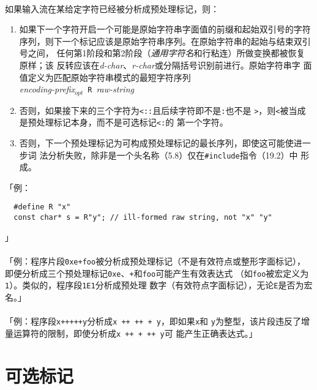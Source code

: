 \paragraph{}
如果输入流在某给定字符已经被分析成预处理标记，则：
\begin{enumerate}
  \item{如果下一个字符开启一个可能是原始字符串字面值的前缀和起始双引号的字符
    序列，则下一个标记应该是原始字符串序列。在原始字符串的起始与结束双引号之间，
    任何第1阶段和第2阶段（\textit{通用字符名}和行粘连）所做变换都被恢复原样；该
    反转应该在\textit{d-char}、\textit{r-char}或分隔括号识别前进行。原始字符串字
    面值定义为匹配原始字符串模式的最短字符序列 \\
    \mbox{\qquad \textit{encoding-prefix}$_{opt}$ \texttt{R}
    \textit{raw-string}}}
  \item{否则，如果接下来的三个字符为\texttt{<::}且后续字符即不是\texttt{:}也不是
    \texttt{>}，则\texttt{<}被当成是预处理标记本身，而不是可选标记\texttt{<:}的
    第一个字符。}
  \item{否则，下一个预处理标记为可构成预处理标记的最长序列，即使这可能使进一步词
    法分析失败，除非是一个头名称（5.8）仅在\texttt{\#include}指令（19.2）中
    形成。}
\end{enumerate}
「例：
\begin{lstlisting}
  #define R "x"
  const char* s = R"y"; // ill-formed raw string, not "x" "y"
\end{lstlisting}」

\paragraph{}
「例：程序片段\texttt{0xe+foo}被分析成预处理标记（不是有效符点或整形字面标记），
即便分析成三个预处理标记\texttt{0xe}、\texttt{+}和\texttt{foo}可能产生有效表达式
（如\texttt{foo}被宏定义为\texttt{1}）。类似的，程序段\texttt{1E1}分析成预处理
数字（有效符点字面标记），无论\texttt{E}是否为宏名。」

\paragraph{}
「例：程序段\texttt{x+++++y}分析成\texttt{x ++ ++ + y}，即如果\texttt{x}和
\texttt{y}为整型，该片段违反了增量运算符的限制，即使分析成\texttt{x ++ + ++ y}可
能产生正确表达式。」

\section{可选标记}
